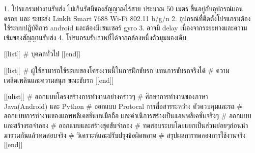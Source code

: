 1. โปรแกรมทำงานรับส่ง ไม่เกินรัศมีของสัญญาณไร้สาย ประมาณ 50 เมตร ขึ้นอยู่กับอุปกรณ์แอนดรอย และ ระยะส่ง Linklt Smart 7688 Wi-Fi 802.11 b/g/n
2. อุปกรณ์ที่ติดตั้งโปรแกรมต้องใช้ระบบปฎิบัติการ android และต้องมีเซนเซอร์ gyro 
3. อาจมี delay เนื่องจากระยะทางและความเข้มของสัญญานรับส่ง
4. โปรแกรมรับภาพที่ได้จากกล้องหนึ่งตัวมุมมองเดิม

[[list]]
# บุคคลทั่วไป
[[end]]

[[list]]
    # ผู้ใช้สามารถใช้ระบบของโครงงานนี้ในการฝึกขับรถ แทนการขับรถจริงได้
    # ความเพลิดเพลินและความสนุก ขณะขับรถ
[[end]]

[[ulist]]
# ออกแบบโครงสร้างการทำงานอย่างคร่าวๆ
# ศึกษาการทำงานของภาษา Java(Android) และ Python
# ออกแบบ Protocal การสื่อสารระหว่าง ตัวควบคุมและรถ
# ออกแบบการทำงานของแอพพลิเคชชั่นบนมือถือ และดำเนิการสร้างเป็นแอพพลิเคชั่นจริงๆ
# ออกแบบและสร้างรถจำลอง
# ออกแบบและสร้างชุดขับจำลอง
# ทดสอบระบบโดยแยกเป็นส่วนย่อยๆก่อนนำมารวมกันแล้วทดสอบจริง
# วิเคราะห์และปรับปรุงข้อผิดพลาด
# สรุปผลการทดลองการใช้งานจริง
[[end]]


